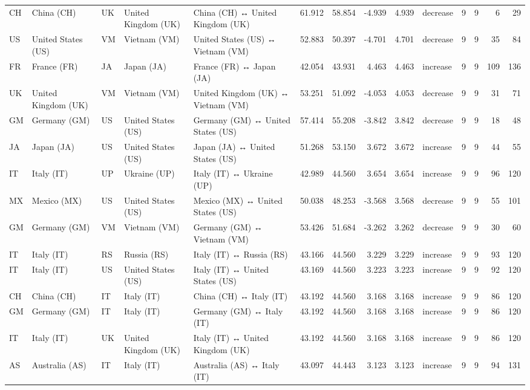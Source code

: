 \begin{tabular}{lllllrrrrlrrrr}
CH & China (CH) & UK & United Kingdom (UK) & China (CH) ↔ United Kingdom (UK) & 61.912 & 58.854 & -4.939 & 4.939 & decrease & 9 & 9 & 6 & 29 \\
US & United States (US) & VM & Vietnam (VM) & United States (US) ↔ Vietnam (VM) & 52.883 & 50.397 & -4.701 & 4.701 & decrease & 9 & 9 & 35 & 84 \\
FR & France (FR) & JA & Japan (JA) & France (FR) ↔ Japan (JA) & 42.054 & 43.931 & 4.463 & 4.463 & increase & 9 & 9 & 109 & 136 \\
UK & United Kingdom (UK) & VM & Vietnam (VM) & United Kingdom (UK) ↔ Vietnam (VM) & 53.251 & 51.092 & -4.053 & 4.053 & decrease & 9 & 9 & 31 & 71 \\
GM & Germany (GM) & US & United States (US) & Germany (GM) ↔ United States (US) & 57.414 & 55.208 & -3.842 & 3.842 & decrease & 9 & 9 & 18 & 48 \\
JA & Japan (JA) & US & United States (US) & Japan (JA) ↔ United States (US) & 51.268 & 53.150 & 3.672 & 3.672 & increase & 9 & 9 & 44 & 55 \\
IT & Italy (IT) & UP & Ukraine (UP) & Italy (IT) ↔ Ukraine (UP) & 42.989 & 44.560 & 3.654 & 3.654 & increase & 9 & 9 & 96 & 120 \\
MX & Mexico (MX) & US & United States (US) & Mexico (MX) ↔ United States (US) & 50.038 & 48.253 & -3.568 & 3.568 & decrease & 9 & 9 & 55 & 101 \\
GM & Germany (GM) & VM & Vietnam (VM) & Germany (GM) ↔ Vietnam (VM) & 53.426 & 51.684 & -3.262 & 3.262 & decrease & 9 & 9 & 30 & 60 \\
IT & Italy (IT) & RS & Russia (RS) & Italy (IT) ↔ Russia (RS) & 43.166 & 44.560 & 3.229 & 3.229 & increase & 9 & 9 & 93 & 120 \\
IT & Italy (IT) & US & United States (US) & Italy (IT) ↔ United States (US) & 43.169 & 44.560 & 3.223 & 3.223 & increase & 9 & 9 & 92 & 120 \\
CH & China (CH) & IT & Italy (IT) & China (CH) ↔ Italy (IT) & 43.192 & 44.560 & 3.168 & 3.168 & increase & 9 & 9 & 86 & 120 \\
GM & Germany (GM) & IT & Italy (IT) & Germany (GM) ↔ Italy (IT) & 43.192 & 44.560 & 3.168 & 3.168 & increase & 9 & 9 & 86 & 120 \\
IT & Italy (IT) & UK & United Kingdom (UK) & Italy (IT) ↔ United Kingdom (UK) & 43.192 & 44.560 & 3.168 & 3.168 & increase & 9 & 9 & 86 & 120 \\
AS & Australia (AS) & IT & Italy (IT) & Australia (AS) ↔ Italy (IT) & 43.097 & 44.443 & 3.123 & 3.123 & increase & 9 & 9 & 94 & 131 \\

\end{tabular}
